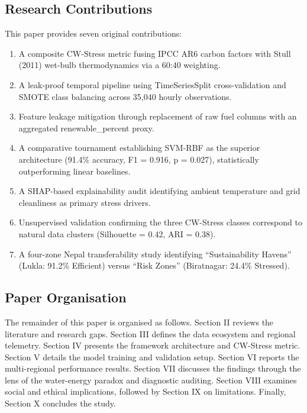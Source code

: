 \documentclass[conference]{IEEEtran}
\begin{document}
\subsection{Research Contributions}
This paper provides seven original contributions:
\begin{enumerate}
    \item A composite CW-Stress metric fusing IPCC AR6 carbon factors with Stull (2011) wet-bulb thermodynamics via a 60:40 weighting.
    \item A leak-proof temporal pipeline using TimeSeriesSplit cross-validation and SMOTE class balancing across 35,040 hourly observations.
    \item Feature leakage mitigation through replacement of raw fuel columns with an aggregated renewable\_percent proxy.
    \item A comparative tournament establishing SVM-RBF as the superior architecture (91.4\% accuracy, F1 = 0.916, p = 0.027), statistically outperforming linear baselines.
    \item A SHAP-based explainability audit identifying ambient temperature and grid cleanliness as primary stress drivers.
    \item Unsupervised validation confirming the three CW-Stress classes correspond to natural data clusters (Silhouette = 0.42, ARI = 0.38).
    \item A four-zone Nepal transferability study identifying ``Sustainability Havens'' (Lukla: 91.2\% Efficient) versus ``Risk Zones'' (Biratnagar: 24.4\% Stressed).
\end{enumerate}

\subsection{Paper Organisation}
The remainder of this paper is organised as follows. Section II reviews the literature and research gaps. Section III defines the data ecosystem and regional telemetry. Section IV presents the framework architecture and CW-Stress metric. Section V details the model training and validation setup. Section VI reports the multi-regional performance results. Section VII discusses the findings through the lens of the water-energy paradox and diagnostic auditing. Section VIII examines social and ethical implications, followed by Section IX on limitations. Finally, Section X concludes the study.
\end{document}
